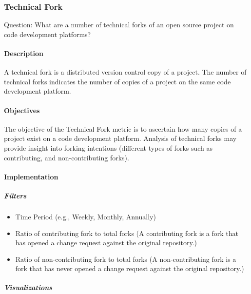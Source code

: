 \hypertarget{technical-fork}{%
\subsubsection{Technical Fork}\label{technical-fork}}

Question: What are a number of technical forks of an open source project
on code development platforms?

\hypertarget{description}{%
\paragraph{Description}\label{description}}

A technical fork is a distributed version control copy of a project. The
number of technical forks indicates the number of copies of a project on
the same code development platform.

\hypertarget{objectives}{%
\paragraph{Objectives}\label{objectives}}

The objective of the Technical Fork metric is to ascertain how many
copies of a project exist on a code development platform. Analysis of
technical forks may provide insight into forking intentions (different
types of forks such as contributing, and non-contributing forks).

\hypertarget{implementation}{%
\paragraph{Implementation}\label{implementation}}

\hypertarget{filters}{%
\subparagraph{Filters}\label{filters}}

\begin{itemize}
\tightlist
\item
  Time Period (e.g., Weekly, Monthly, Annually)
\item
  Ratio of contributing fork to total forks (A contributing fork is a
  fork that has opened a change request against the original
  repository.)
\item
  Ratio of non-contributing fork to total forks (A non-contributing fork
  is a fork that has never opened a change request against the original
  repository.)
\end{itemize}

\hypertarget{visualizations}{%
\subparagraph{Visualizations}\label{visualizations}}

